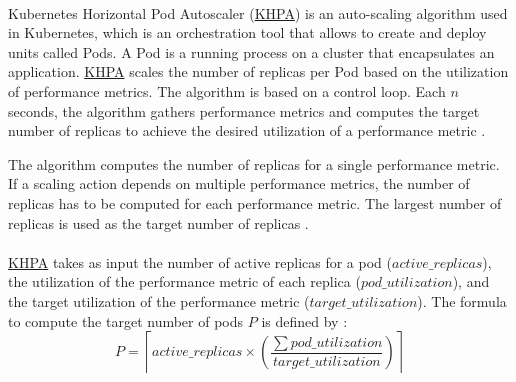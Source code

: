 \paragraph{}
Kubernetes Horizontal Pod Autoscaler (\hyperlink{abbr:khpa}{KHPA}) is an auto-scaling algorithm used in Kubernetes, which is an orchestration tool that allows to create and deploy units called Pods. A Pod is a running process on a cluster that encapsulates an application.
\hyperlink{abbr:khpa}{KHPA} scales the number of replicas per Pod based on the utilization of performance metrics.
The algorithm is based on a control loop. Each $n$ seconds, the algorithm gathers performance metrics and computes the target number of replicas to achieve the desired utilization of a performance metric \cite{Casalicchio2017AutoScaleCont}.


The algorithm computes the number of replicas for a single performance metric. If a scaling action depends on multiple performance metrics, the number of replicas has to be computed for each performance metric. The largest number of replicas is used as the target number of replicas \cite{Kubernetes2021Docs}.


\paragraph{}
\hyperlink{abbr:khpa}{KHPA} takes as input the number of active replicas for a pod ($active\_replicas$), the utilization of the performance metric of each replica ($pod\_utilization$), and the target utilization of the performance metric ($target\_utilization$).
The formula to compute the target number of pods $P$ is defined by \cite{Kubernetes2021Docs}:
\begin{equation}
P = \left \lceil active\_replicas \times \left ( \frac{\sum pod\_utilization}{target\_utilization} \right ) \right \rceil
\label{eq:04_background_khpa_equation}
\end{equation}

